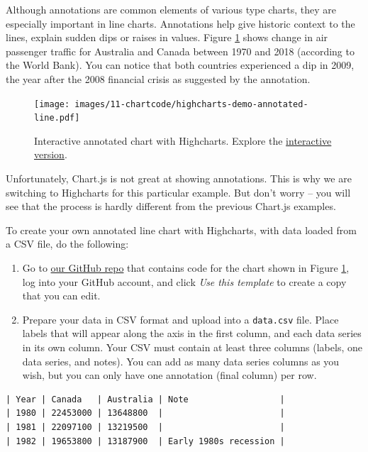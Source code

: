 \documentclass[
  english,
]{book}
\begin{document}
Although annotations are common elements of various type charts, they are especially
important in line charts. Annotations help give historic context to the lines,
explain sudden dips or raises in values. Figure \ref{fig:highcharts-demo-annotated-line}
shows change in air passenger traffic for Australia and Canada between 1970
and 2018 (according to the World Bank). You can notice that both countries experienced
a dip in 2009, the year after the 2008 financial crisis as suggested by the annotation.



\begin{figure}
\centering
\texttt{[image: images/11-chartcode/highcharts-demo-annotated-line.pdf]}
\caption{\label{fig:highcharts-demo-annotated-line}Interactive annotated chart with Highcharts. Explore the \href{https://handsondataviz.github.io/highcharts-line-annotated/}{interactive version}.}
\end{figure}

Unfortunately, Chart.js is not great at showing annotations. This is why we are switching to Highcharts for this particular example. But don't worry -- you will see that the process is hardly different from the previous Chart.js examples.

To create your own annotated line chart with Highcharts, with data loaded from a CSV file, do the following:

\begin{enumerate}
\def\labelenumi{\arabic{enumi}.}
\item
  Go to \href{https://github.com/HandsOnDataViz/highcharts-line-annotated}{our GitHub repo} that contains code for the chart shown in Figure \ref{fig:highcharts-demo-annotated-line}, log into your GitHub account, and click \emph{Use this template} to create a copy that you can edit.
\item
  Prepare your data in CSV format and upload into a \texttt{data.csv} file. Place labels that will appear along the axis in the first column, and each data series in its own column. Your CSV must contain at least three columns (labels, one data series, and notes). You can add as many data series columns as you wish, but you can only have one annotation (final column) per row.
\end{enumerate}

\begin{verbatim}
| Year | Canada   | Australia | Note                  |
| 1980 | 22453000 | 13648800  |                       |
| 1981 | 22097100 | 13219500  |                       |
| 1982 | 19653800 | 13187900  | Early 1980s recession |
\end{verbatim}
\end{document}
